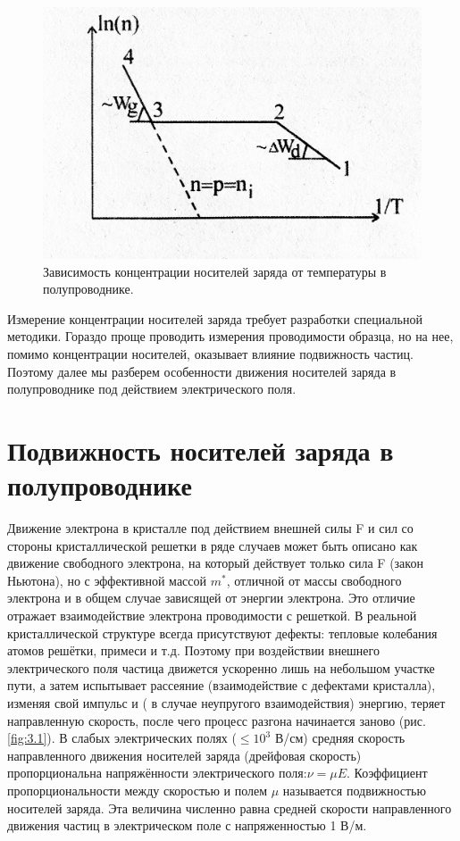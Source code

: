 \begin{figure}[h!]
	\centering
	\includegraphics[width = .7\linewidth]{img/23.jpg}
	\caption{Зависимость концентрации носителей заряда от температуры в полупроводнике.}
	\label{fig:2.2}
\end{figure}

Измерение концентрации носителей заряда требует разработки специальной методики. Гораздо проще проводить измерения
проводимости образца, но на нее, помимо концентрации носителей, оказывает влияние подвижность частиц. Поэтому далее мы
разберем особенности движения носителей заряда в полупроводнике под действием электрического поля. 


\section{Подвижность носителей заряда в полупроводнике}

Движение электрона в кристалле под действием внешней силы F и сил со стороны кристаллической решетки в ряде случаев
может быть описано как движение свободного электрона, на который действует только сила F (закон Ньютона), но с
эффективной массой $m^*$, отличной от массы свободного электрона и в общем случае зависящей от энергии электрона. Это
отличие отражает взаимодействие электрона проводимости с решеткой. 
В реальной кристаллической структуре всегда присутствуют дефекты: тепловые колебания атомов решётки, примеси и т.д.
Поэтому при воздействии внешнего электрического поля частица движется ускоренно лишь на небольшом участке пути, а затем
испытывает рассеяние (взаимодействие с дефектами кристалла), изменяя свой импульс и ( в случае неупругого
взаимодействия) энергию, теряет направленную скорость, после чего процесс разгона начинается заново (рис. \ref{fig:3.1}). В слабых
электрических полях ($\leq 10^3$ В/см) средняя скорость направленного движения носителей заряда (дрейфовая скорость)
пропорциональна напряжённости электрического поля:$\nu = \mu E$. Коэффициент пропорциональности между скоростью и полем $\mu$
называется подвижностью носителей заряда. Эта величина численно равна средней скорости направленного движения частиц в
электрическом поле с напряженностью 1 В/м. 

